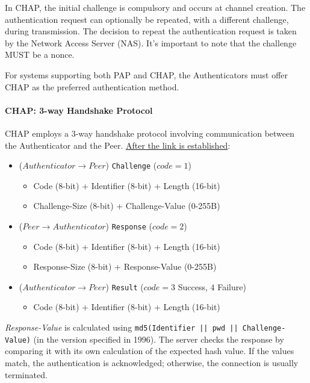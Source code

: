 In CHAP, the initial challenge is compulsory and occurs at channel creation. The authentication request can optionally be repeated, with a different challenge, during transmission. The decision to repeat the authentication request is taken by the Network Access Server (NAS). It's important to note that the challenge MUST be a nonce.

For systems supporting both PAP and CHAP, the Authenticators must offer CHAP as the preferred authentication method.

\paragraph{CHAP: 3-way Handshake Protocol}
CHAP employs a 3-way handshake protocol involving communication between the Authenticator and the Peer.
\underline{After the link is established}:

\begin{itemize}
    \item ($Authenticator \rightarrow Peer$) \texttt{Challenge} ($code=1$)
    \begin{itemize}
        \item Code (8-bit) + Identifier (8-bit) + Length (16-bit)
        \item Challenge-Size (8-bit) + Challenge-Value (0-255B)
    \end{itemize}
    \item ($Peer \rightarrow Authenticator$) \texttt{Response} ($code=2$)
    \begin{itemize}
        \item Code (8-bit) + Identifier (8-bit) + Length (16-bit)
        \item Response-Size (8-bit) + Response-Value (0-255B)
    \end{itemize}
    \item ($Authenticator \rightarrow Peer$) \texttt{Result} ($code= 3$ Success, $4$ Failure)
    \begin{itemize}
        \item Code (8-bit) + Identifier (8-bit) + Length (16-bit)
    \end{itemize}
\end{itemize}

\textit{Response-Value} is calculated using \texttt{md5(Identifier || pwd || Challenge-Value)} (in the version specified in 1996). The server checks the response by comparing it with its own calculation of the expected hash value. If the values match, the authentication is acknowledged; otherwise, the connection is usually terminated.

